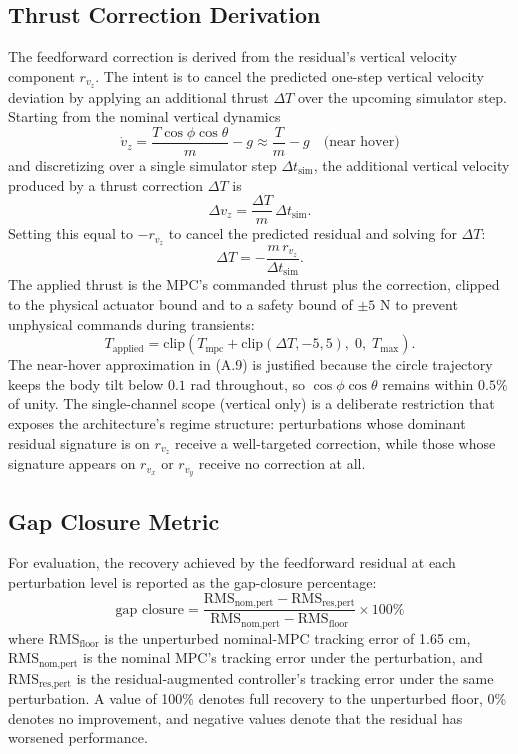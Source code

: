 \documentclass[conference]{IEEEtran}
\begin{document}
\subsection{Thrust Correction Derivation}
The feedforward correction is derived from the residual's vertical velocity component $r_{v_z}$. The intent is to cancel the predicted one-step vertical velocity deviation by applying an additional thrust $\Delta T$ over the upcoming simulator step. Starting from the nominal vertical dynamics
\begin{equation}
\dot{v}_z = \frac{T \cos\phi \cos\theta}{m} - g \approx \frac{T}{m} - g \quad \text{(near hover)} \tag{A.9}
\end{equation}
and discretizing over a single simulator step $\Delta t_{\text{sim}}$, the additional vertical velocity produced by a thrust correction $\Delta T$ is
\begin{equation}
\Delta v_z = \frac{\Delta T}{m}\, \Delta t_{\text{sim}}. \tag{A.10}
\end{equation}
Setting this equal to $-r_{v_z}$ to cancel the predicted residual and solving for $\Delta T$:
\begin{equation}
\Delta T = -\frac{m\, r_{v_z}}{\Delta t_{\text{sim}}}. \tag{A.11}
\end{equation}
The applied thrust is the MPC's commanded thrust plus the correction, clipped to the physical actuator bound and to a safety bound of $\pm 5$ N to prevent unphysical commands during transients:
\begin{equation}
T_{\text{applied}} = \mathrm{clip}\!\left(T_{\text{mpc}} + \mathrm{clip}(\Delta T, -5, 5),\; 0,\; T_{\max}\right). \tag{A.12}
\end{equation}
The near-hover approximation in (A.9) is justified because the circle trajectory keeps the body tilt below $0.1$ rad throughout, so $\cos\phi \cos\theta$ remains within $0.5\%$ of unity. The single-channel scope (vertical only) is a deliberate restriction that exposes the architecture's regime structure: perturbations whose dominant residual signature is on $r_{v_z}$ receive a well-targeted correction, while those whose signature appears on $r_{v_x}$ or $r_{v_y}$ receive no correction at all.

\subsection{Gap Closure Metric}
For evaluation, the recovery achieved by the feedforward residual at each perturbation level is reported as the gap-closure percentage:
\begin{equation}
\text{gap closure} = \frac{\mathrm{RMS}_{\text{nom,pert}} - \mathrm{RMS}_{\text{res,pert}}}{\mathrm{RMS}_{\text{nom,pert}} - \mathrm{RMS}_{\text{floor}}} \times 100\% \tag{A.13}
\end{equation}
where $\mathrm{RMS}_{\text{floor}}$ is the unperturbed nominal-MPC tracking error of 1.65 cm, $\mathrm{RMS}_{\text{nom,pert}}$ is the nominal MPC's tracking error under the perturbation, and $\mathrm{RMS}_{\text{res,pert}}$ is the residual-augmented controller's tracking error under the same perturbation. A value of 100\% denotes full recovery to the unperturbed floor, 0\% denotes no improvement, and negative values denote that the residual has worsened performance.
\end{document}
